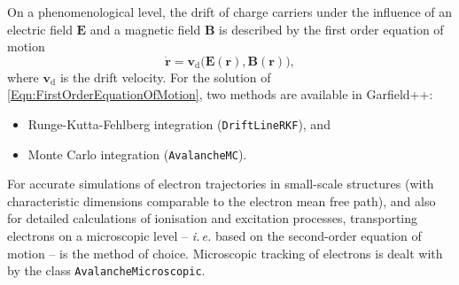 On a phenomenological level, 
the drift of charge carriers under the influence of an 
electric field \(\mathbf{E}\) and a magnetic field \(\mathbf{B}\) 
is described by the first order equation of motion
\begin{equation}\label{Eqn:FirstOrderEquationOfMotion}
  \dot{\mathbf{r}} = 
  \mathbf{v}_{\text{d}}\bigl(\mathbf{E}\left(\mathbf{r}\right), 
                             \mathbf{B}\left(\mathbf{r}\right)\bigr),
\end{equation}
where \(\mathbf{v}_{\text{d}}\) is the drift velocity. 
For the solution of \eqref{Eqn:FirstOrderEquationOfMotion}, 
two methods are available in Garfield++:
\begin{itemize}
  \item
  Runge-Kutta-Fehlberg integration (\texttt{DriftLineRKF}), and
  \item
  Monte Carlo integration (\texttt{AvalancheMC}).
\end{itemize}

For accurate simulations of electron trajectories 
in small-scale structures 
(with characteristic dimensions comparable to the electron mean free path),
and also for detailed calculations of ionisation and excitation processes, 
transporting electrons on a microscopic level -- 
\textit{i.\,e.} based on the second-order equation of motion --
is the method of choice. 
Microscopic tracking of electrons is dealt with by the class 
\texttt{AvalancheMicroscopic}.  
